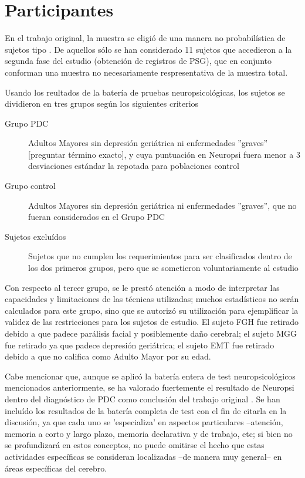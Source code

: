 
\section{Participantes}

En el trabajo original,
la muestra se eligi\'o de una manera no probabilística de sujetos tipo \cite{Garcia09}. De aquellos
s\'olo se han considerado 11 sujetos que accedieron a la segunda fase del estudio (obtenci\'on
de registros de PSG), que en conjunto conforman una muestra no necesariamente respresentativa de
la muestra total.

Usando los reultados de la bater\'ia de pruebas neuropsicol\'ogicas, los sujetos se dividieron
en tres grupos seg\'un los siguientes criterios
\begin{description}
\item[Grupo PDC] Adultos Mayores sin depresi\'on geri\'atrica %
ni enfermedades ''graves'' [preguntar t\'ermino exacto],
y cuya puntuaci\'on en Neuropsi fuera menor a 3 desviaciones est\'andar la repotada para poblaciones
control \cite{Solis03}
\item[Grupo control] Adultos Mayores sin depresi\'on geri\'atrica ni enfermedades ''graves'',
que no fueran considerados en el Grupo PDC
\item[Sujetos exclu\'idos] Sujetos que no cumplen los requerimientos para ser clasificados dentro de
los dos primeros grupos, pero que se sometieron voluntariamente al estudio
\end{description}
Con respecto al tercer grupo, se le prest\'o atenci\'on a modo de interpretar las capacidades y
limitaciones de las t\'ecnicas utilizadas; muchos estad\'isticos no ser\'an calculados para este
grupo,
sino que se autoriz\'o su utilizaci\'on
para ejemplificar la validez de las restricciones para los sujetos de estudio. El sujeto 
FGH fue retirado debido a que padece par\'alisis facial y posiblemente da\~no cerebral; el sujeto MGG
fue retirado ya que padece depresi\'on geri\'atrica; el sujeto EMT fue retirado debido a que no
califica como Adulto Mayor por su edad.

Cabe mencionar que, aunque se aplic\'o la bater\'ia entera de test neuropsicol\'ogicos mencionados
anteriormente, se ha valorado fuertemente el resultado de Neuropsi dentro del diagn\'ostico de PDC
como conclusi\'on del trabajo original \cite{VazquezTagle16}.
Se han inclu\'ido los resultados de la bater\'ia completa de test con el fin de citarla en la
discusi\'on, ya que cada uno se 'especializa' en aspectos particulares --atenci\'on, memoria a corto
y largo plazo, memoria declarativa y de trabajo, etc; si bien no se profundizar\'a en estos
conceptos, no puede omitirse el hecho que estas actividades espec\'ificas se consideran
localizadas --de manera muy general-- en \'areas espec\'ificas del cerebro.

